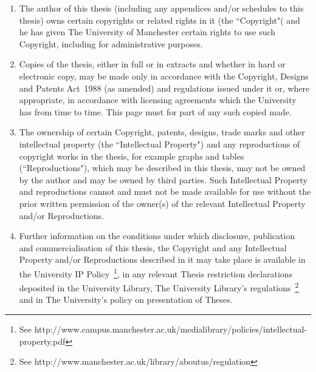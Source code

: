 \begin{enumerate}
	\item The author of this thesis (including any appendices and/or schedules to this thesis) owns certain copyrights or related rights in it (the ``Copyright"( and he has given The University of Manchester certain rights to use such 	Copyright, including for administrative purposes.
	\item Copies of the thesis, either in full or in extracts and whether in hard or electronic copy, may be made only in accordance with the Copyright, Designs and Patents Act~1988 (as amended) and regulations issued under it or, where appropriate, in accordance with licensing agreements which the University has from time to time. This page must for part of any such copied made.
	\item The ownership of certain Copyright, patents, designs, trade marks and other intellectual property (the ``Intellectual Property") and any reproductions of copyright works in the thesis, for example graphs and tables (``Reproductions"), which may be described in this thesis, may not be owned by the author and may be owned by third parties. Such Intellectual Property and reproductions cannot and must not be made available for use without the prior written permission of the owner(s) of the relevant Intellectual Property and/or Reproductions.
	\item Further information on the conditions under which disclosure, publication and commercialisation of this thesis, the Copyright and any Intellectual Property and/or Reproductions described in it may take place is available in the University IP Policy~\footnote{See http://www.campus.manchester.ac.uk/medialibrary/policies/intellectual-property.pdf}, in any relevant Thesis restriction declarations deposited in the University Library, The University Library's regulations~\footnote{See http://www.manchester.ac.uk/library/aboutus/regulation} and in The University's policy on presentation of Theses.
\end{enumerate}
